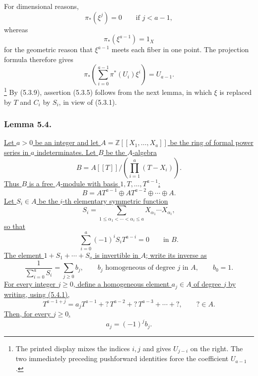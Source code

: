For dimensional reasons,
\[
\pi_*(\xi^j)=0\qquad\text{if }j<a-1,
\]
whereas
\[
\pi_*(\xi^{a-1})=1_X
\]
for the geometric reason that $\xi^{a-1}$ meets each fiber in one
point.  The projection formula therefore gives
\begin{equation}\tag{5.3.9}
\pi_*\!\left(
\sum_{i=0}^{a-1}\pi^*(U_i)\xi^i
\right)=U_{a-1}.
\end{equation}
\footnote{The printed display mixes the indices $i,j$ and gives
$U_{j-i}$ on the right.  The two immediately preceding pushforward
identities force the coefficient $U_{a-1}$.}
By (5.3.9), assertion (5.3.5) follows from the next lemma, in which
$\xi$ is replaced by $T$ and $C_i$ by $S_i$, in view of (5.3.1).

\subsubsection*{Lemma 5.4.}
\underline{Let $a>0$ be an integer and let
$A=\mathbb Z[[X_1,\ldots,X_a]]$ be the ring of formal power series in
$a$ indeterminates.  Let $B$ be the $A$-algebra}
\[
B=A[[T]]\bigg/\left(\prod_{i=1}^{a}(T-X_i)\right).
\]
\underline{Thus $B$ is a free $A$-module with basis
$1,T,\ldots,T^{a-1}$:}
\begin{equation}\tag{5.4.1}
B=AT^{a-1}\oplus AT^{a-2}\oplus\cdots\oplus A.
\end{equation}
\underline{Let $S_i\in A$ be the $i$-th elementary symmetric
function}
\[
S_i=\sum_{1\leq\alpha_1<\cdots<\alpha_i\leq a}
X_{\alpha_1}\cdots X_{\alpha_i},
\]
\underline{so that}
\begin{equation}\tag{5.4.2}
\sum_{i=0}^{a}(-1)^iS_iT^{a-i}=0
\qquad\text{in }B.
\end{equation}
\underline{The element $1+S_1+\cdots+S_a$ is invertible in $A$;
write its inverse as}
\begin{equation}\tag{5.4.3}
\frac{1}{\sum_{i=0}^{a}S_i}
=\sum_{j\geq0}b_j,
\qquad
b_j\text{ homogeneous of degree }j\text{ in }A,
\qquad b_0=1.
\end{equation}
\underline{For every integer $j\geq0$, define a homogeneous element
$a_j\in A$ of degree $j$ by writing, using (5.4.1),}
\begin{equation}\tag{5.4.4}
T^{a-1+j}
=a_jT^{a-1}+{}?\,T^{a-2}+{}?\,T^{a-3}+\cdots+{}?,
\qquad ?\in A.
\end{equation}
\underline{Then, for every $j\geq0$,}
\begin{equation}\tag{5.4.5}
a_j=(-1)^jb_j.
\end{equation}

